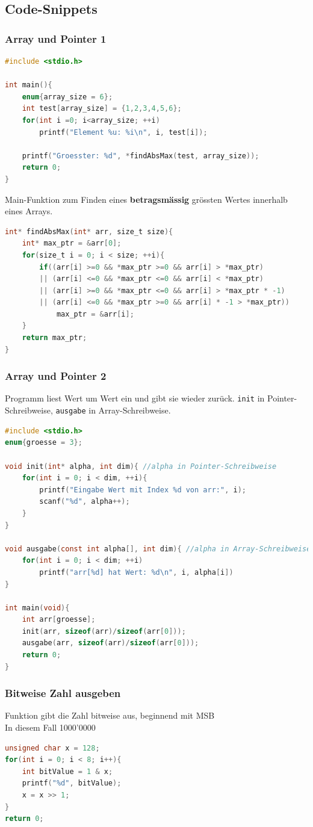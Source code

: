 	\subsection{Code-Snippets}
		\subsubsection{Array und Pointer 1}
			\begin{lstlisting}[language=C]
#include <stdio.h>

int main(){
	enum{array_size = 6};
	int test[array_size] = {1,2,3,4,5,6};
	for(int i =0; i<array_size; ++i)
		printf("Element %u: %i\n", i, test[i]);
	
	printf("Groesster: %d", *findAbsMax(test, array_size));
	return 0;
}
			\end{lstlisting}
			Main-Funktion zum Finden eines \textbf{betragsmässig} grössten Wertes innerhalb eines Arrays.

			\begin{lstlisting}[language=C]
int* findAbsMax(int* arr, size_t size){
	int* max_ptr = &arr[0];
	for(size_t i = 0; i < size; ++i){
		if((arr[i] >=0 && *max_ptr >=0 && arr[i] > *max_ptr)
		|| (arr[i] <=0 && *max_ptr <=0 && arr[i] < *max_ptr)
		|| (arr[i] >=0 && *max_ptr <=0 && arr[i] > *max_ptr * -1)
		|| (arr[i] <=0 && *max_ptr >=0 && arr[i] * -1 > *max_ptr))
			max_ptr = &arr[i];
	}
	return max_ptr;
}
			\end{lstlisting}
		
		\subsubsection{Array und Pointer 2}
			Programm liest Wert um Wert ein und gibt sie wieder zurück. \verb|init| in Pointer-Schreibweise, \verb|ausgabe| in Array-Schreibweise.
			\begin{lstlisting}[language=C]
#include <stdio.h>
enum{groesse = 3};

void init(int* alpha, int dim){ //alpha in Pointer-Schreibweise
	for(int i = 0; i < dim, ++i){
		printf("Eingabe Wert mit Index %d von arr:", i);
		scanf("%d", alpha++);
	}
}

void ausgabe(const int alpha[], int dim){ //alpha in Array-Schreibweise
	for(int i = 0; i < dim; ++i)
		printf("arr[%d] hat Wert: %d\n", i, alpha[i])
}

int main(void){
	int arr[groesse];
	init(arr, sizeof(arr)/sizeof(arr[0]));
	ausgabe(arr, sizeof(arr)/sizeof(arr[0]));
	return 0;
}
			\end{lstlisting}

		\subsubsection{Bitweise Zahl ausgeben}
			Funktion gibt die Zahl bitweise aus, beginnend mit MSB\\
			In diesem Fall 1000'0000
			\begin{lstlisting}[language=C]
unsigned char x = 128;
for(int i = 0; i < 8; i++){
	int bitValue = 1 & x;
	printf("%d", bitValue);
	x = x >> 1;
}
return 0;
			\end{lstlisting}